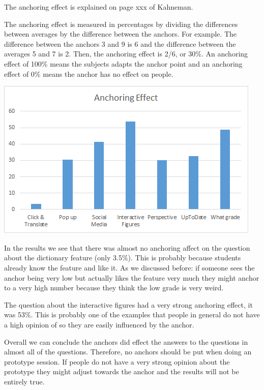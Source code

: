 \documentclass[Main.tex]{subfiles}
\begin{document}
The anchoring effect is explained on page xxx of Kahneman. 

The anchoring effect is measured in percentages by dividing the differences between averages by the difference between the anchors. For example. The difference between the anchors 3 and 9 is 6 and the difference between the averages 5 and 7 is 2. Then, the anchoring effect is 2/6, or 30\%. An anchoring effect of 100\% means the subjects adapts the anchor point and an anchoring effect of 0\% means the anchor has no effect on people. 

\includegraphics[width=\textwidth]{Anchoringpictures}

In the results we see that there was almost no anchoring affect on the question about the dictionary feature (only 3.5\%). This is probably because students already know the feature and like it. As we discussed before: if someone sees the anchor being very low but actually likes the feature very much they might anchor to a very high number because they think the low grade is very weird.

The question about the interactive figures had a very strong anchoring effect, it was 53\%. This is probably one of the examples that people in general do not have a high opinion of so they are easily influenced by the anchor.

Overall we can conclude the anchors did effect the answers to the questions in almost all of the questions. Therefore, no anchors should be put when doing an prototype session. If people do not have a very strong opinion about the prototype they might adjust towards the anchor and the results will not be entirely true.
\end{document}
